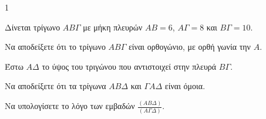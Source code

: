 \begin{ylh}{1}
    \item [Ύλη από εικόνα]
\end{ylh}
\begin{figure}
\centering
{}
\end{figure}
Δίνεται τρίγωνο $ΑΒΓ$ με μήκη πλευρών $ΑΒ=6$, $ΑΓ=8$ και $ΒΓ=10$.
\begin{alist}
    \item Να αποδείξετε ότι το τρίγωνο $ΑΒΓ$ είναι ορθογώνιο, με ορθή γωνία την $Α$. 
    \item Έστω $ΑΔ$ το ύψος του τριγώνου που αντιστοιχεί στην πλευρά $ΒΓ$.
    \begin{rlist}
        \item Να αποδείξετε ότι τα τρίγωνα $ΑΒΔ$ και $ΓΑΔ$ είναι όμοια. 
        \item Να υπολογίσετε το λόγο των εμβαδών $\frac{(ΑΒΔ)}{(ΑΓΔ)}$. 
    \end{rlist}
\end{alist}